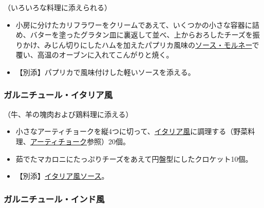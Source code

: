 \begin{recette}
（いろいろな料理に添えられる）

\begin{itemize}
\item
  小房に分けたカリフラワーをクリームであえて、いくつかの小さな容器に詰め、バターを塗ったグラタン皿に裏返して並べ、上からおろしたチーズを振りかけ、みじん切りにしたハムを加えたパプリカ風味の\protect\hyperlink{sauce-mornay}{ソース・モルネー}で覆い、高温のオーブンに入れてこんがりと焼く。
\item
  【別添】パプリカで風味付けした軽いソースを添える。
\end{itemize}

\atoaki{}

\hypertarget{garniture-a-l-italienne}{%
\subsubsection{ガルニチュール・イタリア風}\label{garniture-a-l-italienne}}



（牛、羊の塊肉および鶏料理に添える）

\begin{itemize}
\item
  小さなアーティチョークを縦4つに切って、\protect\hyperlink{quartiers-d-artichauts-a-l-italienne}{イタリア風}に調理する（野菜料理、\protect\hyperlink{artichauts}{アーティチョーク}参照）20個。
\item
  茹でたマカロニにたっぷりチーズをあえて円盤型にしたクロケット10個。
\item
  【別添】\protect\hyperlink{sauce-italienne}{イタリア風ソース}。
\end{itemize}

\atoaki{}

\hypertarget{garniture-a-l-indienne}{%
\subsubsection{ガルニチュール・インド風}\label{garniture-a-l-indienne}}




\end{recette}
